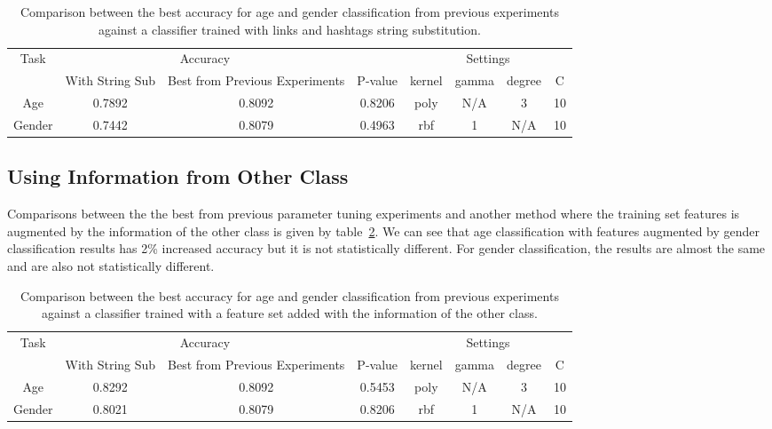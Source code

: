 \documentclass[a4paper]{llncs}
\begin{document}
\begin{table}[!htbp]
\centering
\begin{tabular}{|c|c|c|c|c|c|c|c|}
\hline
\multirow{2}{*}{Task} & \multicolumn{2}{c|}{Accuracy}                    &         & \multicolumn{4}{c|}{Settings} \\ \cline{2-8} 
                      & With String Sub & Best from Previous Experiments & P-value & kernel  & gamma & degree & C  \\ \hline
Age                   & 0.7892          & 0.8092                         & 0.8206  & poly    & N/A   & 3      & 10 \\ \hline
Gender                & 0.7442          & 0.8079                         & 0.4963  & rbf     & 1     & N/A    & 10 \\ \hline
\end{tabular}
\caption{Comparison between the best accuracy for age and gender classification from previous experiments against a classifier trained with links and hashtags string substitution.}
\label{table:StringSub}
\end{table}


\subsection{Using Information from Other Class}
Comparisons between the the best from previous parameter tuning experiments and another method where the training set features is augmented by the information of the other class is given by table~\ref{table:WithPriors}. We can see that age classification with features augmented by gender classification results has 2\% increased accuracy but it is not statistically different. For gender classification, the results are almost the same and are also not statistically different. 

\begin{table}[!htbp]
\centering
\begin{tabular}{|c|c|c|c|c|c|c|c|}
\hline
\multirow{2}{*}{Task} & \multicolumn{2}{c|}{Accuracy}                    &         & \multicolumn{4}{c|}{Settings} \\ \cline{2-8} 
                      & With String Sub & Best from Previous Experiments & P-value & kernel  & gamma & degree & C  \\ \hline
Age                   & 0.8292          & 0.8092                         & 0.5453  & poly    & N/A   & 3      & 10 \\ \hline
Gender                & 0.8021          & 0.8079                         & 0.8206  & rbf     & 1     & N/A    & 10 \\ \hline
\end{tabular}
\caption{Comparison between the best accuracy for age and gender classification from previous experiments against a classifier trained with a feature set added with the information of the other class.}
\label{table:WithPriors}
\end{table}
\end{document}
